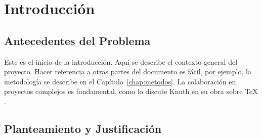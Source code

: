 \chapter{Introducción}
\label{chap:intro}

\section{Antecedentes del Problema}
\label{sec:antecedentes}
Este es el inicio de la introducción. Aquí se describe el contexto general del proyecto.
Hacer referencia a otras partes del documento es fácil, por ejemplo, la metodología se describe en el Capítulo~\ref{chap:metodos}.
La colaboración en proyectos complejos es fundamental, como lo discute Knuth en su obra sobre TeX \cite{knuth1984}.

\section{Planteamiento y Justificación}